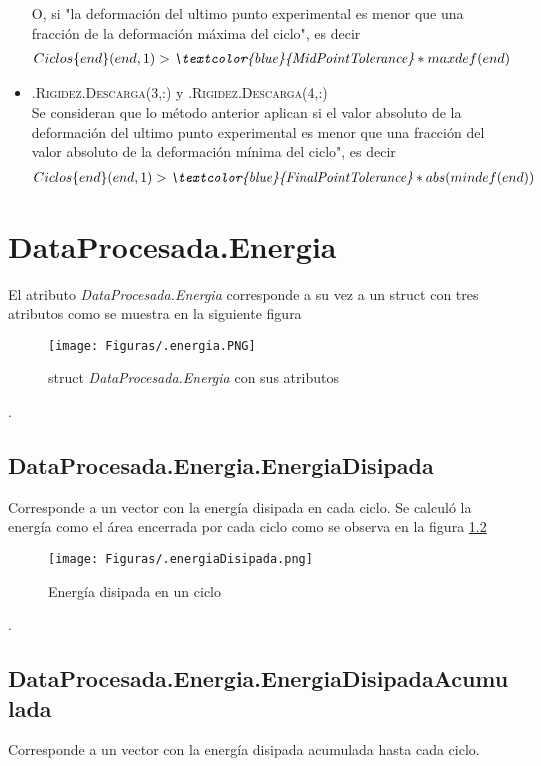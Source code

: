 \documentclass[a4paper, 11pt,article,oneside]{memoir}%
\begin{document}
\begin{itemize}
    O, si  "la deformación del ultimo punto experimental es menor  que una fracción de la deformación máxima del ciclo", es decir
    \begin{align*}
        Ciclos\{end\}(end,1)>\textit{\textcolor{blue}{MidPointTolerance}}*maxdef(end)
    \end{align*}
    \item \textsc{.Rigidez.Descarga(3,:)} y \textsc{.Rigidez.Descarga(4,:)} \\
    Se consideran que lo método anterior aplican si el valor absoluto de la  deformación del ultimo punto experimental es menor que una fracción del valor absoluto de la deformación mínima del ciclo", es decir
    \begin{align*}
        Ciclos\{end\}(end,1)>\textit{\textcolor{blue}{FinalPointTolerance}}*abs(mindef(end))
    \end{align*}
    
   
\end{itemize}
\newpage
\chapter{DataProcesada.Energia}
El atributo \textit{DataProcesada.Energia} corresponde a su vez a un struct con tres atributos como se muestra en la siguiente figura
\begin{figure}[h!]
    \centering
    \texttt{[image: Figuras/.energia.PNG]}
    \caption{struct \textit{DataProcesada.Energia} con sus atributos}
    \label{fig:first resumen e4 }
\end{figure}.
\section{DataProcesada.Energia.EnergiaDisipada}
Corresponde a un vector con la energía disipada en cada ciclo. Se calculó la energía como el área encerrada por cada ciclo como se observa en la figura \ref{fig:first resumen e543}
\begin{figure}[h!]
    \centering
    \texttt{[image: Figuras/.energiaDisipada.png]}
    \caption{Energía disipada en un ciclo}
    \label{fig:first resumen e543}
\end{figure}.
\section{DataProcesada.Energia.EnergiaDisipadaAcumulada}
Corresponde a un vector con la energía disipada acumulada hasta cada ciclo.
\end{document}
